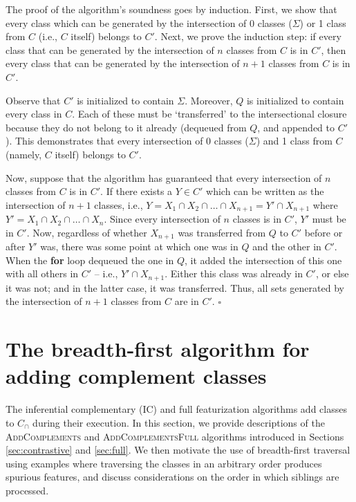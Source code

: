 \documentclass[12pt, oneside]{article}   	%
\begin{document}
\vspace{\baselineskip} \noindent The proof of the algorithm's soundness goes by induction. First, we show that every class which can be generated by the intersection of $0$ classes ($\Sigma$) or 1 class from $C$ (i.e., $C$ itself) belongs to $C'$. Next, we prove the induction step: if every class that can be generated by the intersection of $n$ classes from $C$ is in $C'$, then every class that can be generated by the intersection of $n+1$ classes from $C$ is in $C'$.

Observe that $C'$ is initialized to contain $\Sigma$. Moreover, $Q$ is initialized to contain every class in $C$. Each of these must be `transferred' to the intersectional closure because they do not belong to it already (dequeued from $Q$, and appended to $C'$). This demonstrates that every intersection of 0 classes ($\Sigma$) and 1 class from $C$ (namely, $C$ itself) belongs to $C'$.

Now, suppose that the algorithm has guaranteed that every intersection of $n$ classes from $C$ is in $C'$. If there exists a $Y \in C'$ which can be written as the intersection of $n+1$ classes, i.e., $Y = X_1 \cap X_2 \cap \ldots \cap X_{n+1} = Y' \cap X_{n+1}$ where $Y' = X_1 \cap X_2 \cap \ldots \cap X_n$. Since every intersection of $n$ classes is in $C'$, $Y'$ must be in $C'$. Now, regardless of whether $X_{n+1}$ was transferred from $Q$ to $C'$ before or after $Y'$ was, there was some point at which one was in $Q$ and the other in $C'$. When the \textbf{for} loop dequeued the one in $Q$, it added the intersection of this one with all others in $C'$ -- i.e., $Y' \cap X_{n+1}$. Either this class was already in $C'$, or else it was not; and in the latter case, it was transferred. Thus, all sets generated by the intersection of $n+1$ classes from $C$ are in $C'$. $\square$


\section{The breadth-first algorithm for adding complement classes}
\label{app:complements}

The inferential complementary (IC) and full featurization algorithms add classes to $C_\cap$ during their execution. In this section, we provide descriptions of the \textsc{AddComplements} and \textsc{AddComplementsFull} algorithms introduced in Sections \ref{sec:contrastive} and \ref{sec:full}. We then motivate the use of breadth-first traversal using examples where traversing the classes in an arbitrary order produces spurious features, and discuss considerations on the order in which siblings are processed.
\end{document}
